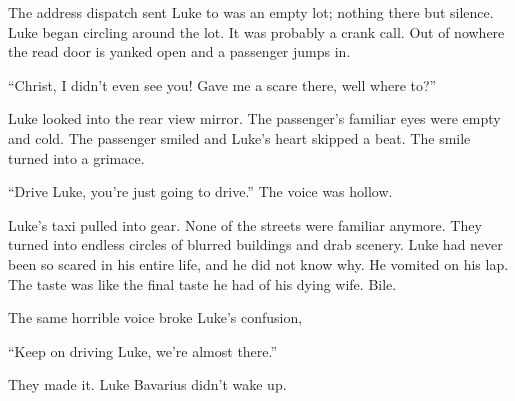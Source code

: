 The address dispatch sent Luke to was an empty lot; nothing there
but silence. Luke began circling around the lot. It was probably a
crank call. Out of nowhere the read door is yanked open and a
passenger jumps in.

``Christ, I didn't even see you! Gave me a scare there,
well where to?''

Luke looked into the rear view mirror. The passenger's
familiar eyes were empty and cold. The passenger smiled and
Luke's heart skipped a beat. The smile turned into a
grimace.



``Drive Luke, you're just going to drive.'' The
voice was hollow.



Luke's taxi pulled into gear. None of the streets were
familiar anymore. They turned into endless circles of blurred
buildings and drab scenery. Luke had never been so scared in his
entire life, and he did not know why. He vomited on his lap. The
taste was like the final taste he had of his dying wife.
Bile.



The same horrible voice broke Luke's confusion,

``Keep on driving Luke, we're almost there.''



They made it. Luke Bavarius didn't wake up. 

 






